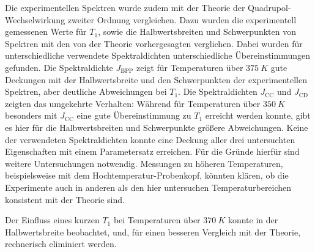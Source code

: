 Die experimentellen Spektren wurde zudem mit der Theorie der Quadrupol-Wech\-sel\-wir\-kung zweiter Ordnung vergleichen. Dazu wurden die experimentell gemessenen Werte für $T_1$, sowie die Halbwertsbreiten und Schwerpunkten von Spektren mit den von der Theorie vorhergesagten verglichen. Dabei wurden für unterschiedliche verwendete Spektraldichten unterschiedliche Übereinstimmungen gefunden. Die Spektraldichte $J_\text{BPP}$ zeigt für Temperaturen über $\SI{375}{K}$ gute Deckungen mit der Halbwertsbreite und den Schwerpunkten der experimentellen Spektren, aber deutliche Abweichungen bei $T_1$. Die Spektraldichten $J_\text{CC}$ und $J_\text{CD}$ zeigten das umgekehrte Verhalten: Während für Temperaturen über $\SI{350}{K}$ besonders mit $J_\text{CC}$ eine gute Übereinstimmung zu $T_1$ erreicht werden konnte, gibt es hier für die Halbwertsbreiten und Schwerpunkte größere Abweichungen. Keine der verwendeten Spektraldichten konnte eine Deckung aller drei untersuchten Eigenschaften mit einem Parametersatz erreichen. Für die Gründe hierfür sind weitere Untersuchungen notwendig. Messungen zu höheren Temperaturen, beispielsweise mit dem Hochtemperatur-Probenkopf, könnten klären, ob die Experimente auch in anderen als den hier untersuchen Temperaturbereichen konsistent mit der Theorie sind.

Der Einfluss eines kurzen $T_1$ bei Temperaturen über $\SI{370}{K}$ konnte in der Halbwertsbreite beobachtet, und, für einen besseren Vergleich mit der Theorie, rechnerisch eliminiert werden.

